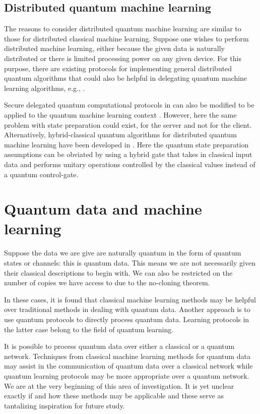 \documentclass[twocolumn, aps, rmp, amsmath, amssymb, nofootinbib, superscriptaddress, longbibliography, floatfix, table-of-contents, eqsecnum]{revtex4-2}
\begin{document}
\subsection{Distributed quantum machine learning}
The reasons to consider distributed quantum machine learning are similar to those for distributed classical machine learning. Suppose one wishes to perform distributed machine learning, either because the given data is naturally distributed or there is limited processing power on any given device. For this purpose, there are existing protocols for implementing general distributed quantum algorithms that could also be helpful in delegating quantum machine learning algorithms, e.g., \cite{beals2013efficient}.

Secure delegated quantum computational protocols in \cite{joe} can also be modified to be applied to the quantum machine learning context \cite{sheng2017distributed, bang2015protocol}. However, here the same problem with state preparation could exist, for the server and not for the client. Alternatively, hybrid-classical quantum algorithms for distributed quantum machine learning have been developed in \cite{yoo2014quantum}. Here the quantum state preparation assumptions can be obviated by using a hybrid gate that takes in classical input data and performs unitary operations controlled by the classical values instead of a quantum control-gate.
\section{Quantum data and machine learning} \label{sec:sec4}
Suppose the data we are give are naturally quantum in the form of quantum states or channels: this is quantum data. This means we are not necessarily given their classical descriptions to begin with. We can also be restricted on the number of copies we have access to due to the no-cloning theorem.

In these cases, it is found that classical machine learning methods may be helpful over traditional methods in dealing with quantum data. Another approach is to use quantum protocols to directly process quantum data. Learning protocols in the latter case belong to the field of quantum learning.

It is possible to process quantum data over either a classical or a quantum network. Techniques from classical machine learning methods for quantum data may assist in the communication of quantum data over a classical network while quantum learning protocols may be more appropriate over a quantum network. We are at the very beginning of this area of investigation. It is yet unclear exactly if and how these methods may be applicable and these serve as tantalizing inspiration for future study.
\end{document}
